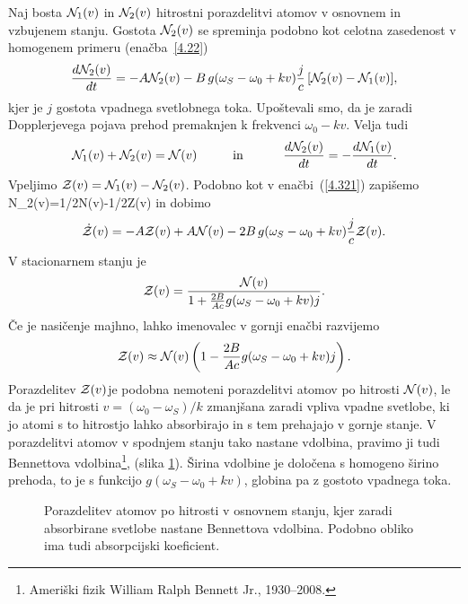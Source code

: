 Naj bosta ${\cal N}_{1}(v)$ in ${\cal N}_{2}(v)$ hitrostni porazdelitvi
atomov v osnovnem in vzbujenem stanju. Gostota
${\cal N}_{2}(v)$ se spreminja podobno kot celotna
zasedenost v homogenem primeru (enačba~\ref{4.22})
\begin{equation}
\frac{d{\cal N}_{2}(v)}{dt}=-A{\cal N}_{2}(v) -B\, g(\omega_S-\omega_{0}+kv)
\frac{j}{c}\,
[{\cal N}_{2}(v)-{\cal N}_{1}(v)],
\label{4.85}
\end{equation}
 kjer je $j$ gostota vpadnega svetlobnega toka. Upoštevali
smo, da je zaradi Dopplerjevega pojava prehod premaknjen k frekvenci
$\omega_{0}-kv$. Velja tudi
\begin{equation}
{\cal N}_{1}(v)+{\cal N}_{2}(v)={\cal N}(v)\mbox{\hskip1cm in \hskip1cm}\frac{d{\cal N}_{2}(v)}{dt}=-\frac{d{\cal N}_{1}(v)}{dt}.
\label{4.86}
\end{equation}
Vpeljimo ${\cal Z}(v)={\cal N}_{1}(v)-{\cal N}_{2}(v)$. Podobno kot 
v enačbi~(\ref{4.321}) zapišemo
\beq
{\cal N}_{2}(v)=1/2{\cal N}(v)-1/2{\cal Z}(v)
\eeq
in dobimo 
\begin{equation}
\dot{{\cal Z}}(v)=-A{\cal Z}(v)+A{\cal N}(v)
-2B\,g(\omega_S-\omega_{0}+kv)\frac{j}{c}
{\cal Z}(v).
\label{4.87}
\end{equation}
V stacionarnem stanju je 
\begin{equation}
{\cal Z}(v)=\frac{{\cal N}(v)}{1+\frac{2B}{Ac}g(\omega_S-\omega_{0}+kv)j}.
\label{4.88}
\end{equation}
 Če je nasičenje majhno, lahko imenovalec v gornji enačbi razvijemo
\begin{equation}
{\cal Z}(v)\approx{\cal N}(v)\left(1-\frac{2B}{Ac}g(\omega_S-\omega_{0}+kv)j\right).
\label{4.89}
\end{equation}
Porazdelitev ${\cal Z}(v)$je podobna nemoteni porazdelitvi atomov
po hitrosti ${\cal N}(v)$, le da je pri hitrosti $v=(\omega_{0}-\omega_S)/k$
zmanjšana zaradi vpliva vpadne svetlobe, ki jo atomi s to hitrostjo
lahko absorbirajo in s tem prehajajo v gornje stanje. V porazdelitvi
atomov v spodnjem stanju tako nastane vdolbina, 
pravimo ji tudi Bennettova
vdolbina\footnote{Ameriški fizik William Ralph Bennett Jr., 1930--2008.}, 
(slika \ref{fig:Bennet}). Širina vdolbine je določena
s homogeno širino prehoda, to je s funkcijo $g(\omega_S-\omega_{0}+kv)$,
globina pa z gostoto vpadnega toka.
\begin{figure}[h]
\centering
\def\svgwidth{90truemm} 

\caption{Porazdelitev atomov po hitrosti v osnovnem stanju, kjer zaradi
absorbirane svetlobe nastane Bennettova vdolbina. Podobno obliko ima 
tudi absorpcijski koeficient.}
\label{fig:Bennet}
\end{figure}

